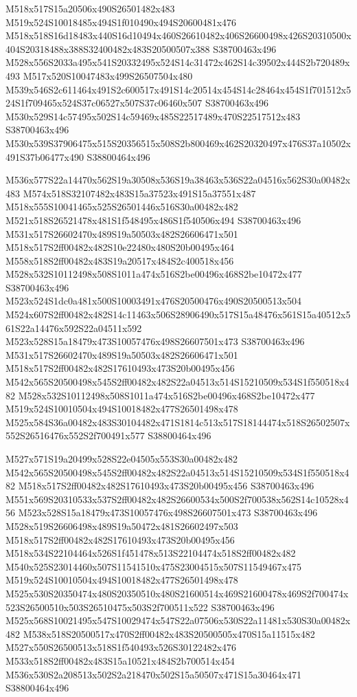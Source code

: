 \documentclass{article}
\begin{document}
\begin{multicols}{2}
M518x517S15a20506x490S26501482x483 M519x524S10018485x494S1f010490x494S20600481x476 M518x518S16d18483x440S16d10494x460S26610482x406S26600498x426S20310500x404S20318488x388S32400482x483S20500507x388 S38700463x496 M528x556S2033a495x541S20332495x524S14c31472x462S14c39502x444S2b720489x493 M517x520S10047483x499S26507504x480 M539x546S2c611464x491S2c600517x491S14c20514x454S14c28464x454S1f701512x524S1f709465x524S37c06527x507S37c06460x507 S38700463x496 M530x529S14c57495x502S14c59469x485S22517489x470S22517512x483 S38700463x496 M530x539S37906475x515S20356515x508S2b800469x462S20320497x476S37a10502x491S37b06477x490 S38800464x496

M536x577S22a14470x562S19a30508x536S19a38463x536S22a04516x562S30a00482x483 M574x518S32107482x483S15a37523x491S15a37551x487 M518x555S10041465x525S26501446x516S30a00482x482 M521x518S26521478x481S1f548495x486S1f540506x494 S38700463x496 M531x517S26602470x489S19a50503x482S26606471x501 M518x517S2ff00482x482S10e22480x480S20b00495x464 M558x518S2ff00482x483S19a20517x484S2c400518x456 M528x532S10112498x508S1011a474x516S2be00496x468S2be10472x477 S38700463x496 M523x524S1dc0a481x500S10003491x476S20500476x490S20500513x504 M524x607S2ff00482x482S14c11463x506S28906490x517S15a48476x561S15a40512x561S22a14476x592S22a04511x592 M523x528S15a18479x473S10057476x498S26607501x473 S38700463x496 M531x517S26602470x489S19a50503x482S26606471x501 M518x517S2ff00482x482S17610493x473S20b00495x456 M542x565S20500498x545S2ff00482x482S22a04513x514S15210509x534S1f550518x482 M528x532S10112498x508S1011a474x516S2be00496x468S2be10472x477 M519x524S10010504x494S10018482x477S26501498x478 M525x584S36a00482x483S30104482x471S1814c513x517S18144474x518S26502507x552S26516476x552S2f700491x577 S38800464x496

M527x571S19a20499x528S22e04505x553S30a00482x482 M542x565S20500498x545S2ff00482x482S22a04513x514S15210509x534S1f550518x482 M518x517S2ff00482x482S17610493x473S20b00495x456 S38700463x496 M551x569S20310533x537S2ff00482x482S26600534x500S2f700538x562S14c10528x456 M523x528S15a18479x473S10057476x498S26607501x473 S38700463x496 M528x519S26606498x489S19a50472x481S26602497x503 M518x517S2ff00482x482S17610493x473S20b00495x456 M518x534S22104464x526S1f451478x513S22104474x518S2ff00482x482 M540x525S23014460x507S11541510x475S23004515x507S11549467x475 M519x524S10010504x494S10018482x477S26501498x478 M525x530S20350474x480S20350510x480S21600514x469S21600478x469S2f700474x523S26500510x503S26510475x503S2f700511x522 S38700463x496 M525x568S10021495x547S10029474x547S22a07506x530S22a11481x530S30a00482x482 M538x518S20500517x470S2ff00482x483S20500505x470S15a11515x482 M527x550S26500513x518S1f540493x526S30122482x476 M533x518S2ff00482x483S15a10521x484S2b700514x454 M536x530S2a208513x502S2a218470x502S15a50507x471S15a30464x471 S38800464x496


\end{multicols}
\end{document}
